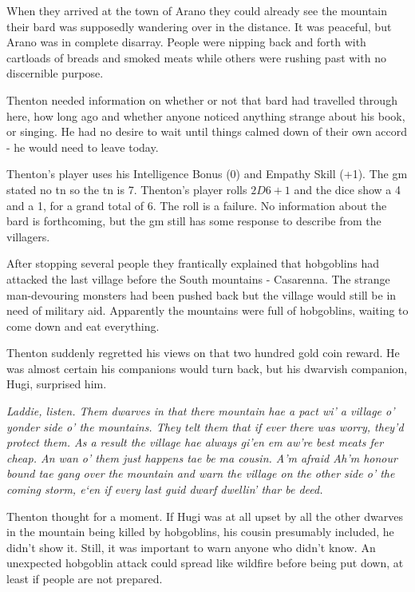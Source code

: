 \begin{multicols}{2}
\begin{exampletext}

When they arrived at the town of Arano they could already see the mountain their bard was supposedly wandering over in the distance. It was peaceful, but Arano was in complete disarray. People were nipping back and forth with cartloads of breads and smoked meats while others were rushing past with no discernible purpose.

Thenton needed information on whether or not that bard had travelled through here, how long ago and whether anyone noticed anything strange about his book, or singing. He had no desire to wait until things calmed down of their own accord - he would need to leave today.

Thenton's player uses his Intelligence Bonus (0) and Empathy Skill (+1).
The \gls{gm} stated no \gls{tn} so the \gls{tn} is 7.
Thenton's player rolls $2D6+1$ and the dice show a 4 and a 1, for a grand total of 6.
The roll is a failure.
No information about the bard is forthcoming, but the \gls{gm} still has some response to describe from the villagers.

After stopping several people they frantically explained that hobgoblins had attacked the last village before the South mountains - Casarenna.
The strange man-devouring monsters had been pushed back but the village would still be in need of military aid.
Apparently the mountains were full of hobgoblins, waiting to come down and eat everything.

Thenton suddenly regretted his views on that two hundred gold coin reward. He was almost certain his companions would turn back, but his dwarvish companion, Hugi, surprised him.

	\emph{Laddie, listen. Them dwarves in that there mountain hae a pact wi' a village o' yonder side o' the mountains. They telt them that if ever there was worry, they'd protect them. As a result the village hae always gi'en em aw're best meats fer cheap. An wan o' them just happens tae be ma cousin. A'm afraid Ah'm honour bound tae gang over the mountain and warn the village on the other side o' the coming storm, e`en if every last guid dwarf dwellin' thar be deed.}

Thenton thought for a moment. If Hugi was at all upset by all the other dwarves in the mountain being killed by hobgoblins, his cousin presumably included, he didn't show it.
Still, it was important to warn anyone who didn't know.
An unexpected hobgoblin attack could spread like wildfire before being put down, at least if people are not prepared.


\end{exampletext}
\end{multicols}
